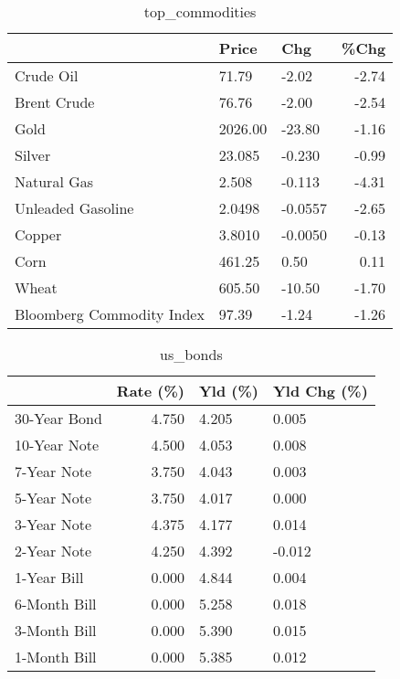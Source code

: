 \documentclass{article}%
\begin{document}
\begin{table}[htbp]%
\caption{top\_commodities}%
\centering%
\begin{adjustbox}{width=1\textwidth}%
\begin{tabular}{lllr}
\toprule
                          &   Price &     Chg &  \%Chg \\
\midrule
               Crude Oil  &   71.79 &   -2.02 & -2.74 \\
             Brent Crude  &   76.76 &   -2.00 & -2.54 \\
                    Gold  & 2026.00 &  -23.80 & -1.16 \\
                  Silver  &  23.085 &  -0.230 & -0.99 \\
             Natural Gas  &   2.508 &  -0.113 & -4.31 \\
       Unleaded Gasoline  &  2.0498 & -0.0557 & -2.65 \\
                  Copper  &  3.8010 & -0.0050 & -0.13 \\
                    Corn  &  461.25 &    0.50 &  0.11 \\
                   Wheat  &  605.50 &  -10.50 & -1.70 \\
Bloomberg Commodity Index &   97.39 &   -1.24 & -1.26 \\
\bottomrule
\end{tabular}
%
\end{adjustbox}%
\end{table}

%


\begin{table}[htbp]%
\caption{us\_bonds}%
\centering%
\begin{adjustbox}{width=1\textwidth}%
\begin{tabular}{lrll}
\toprule
             &  Rate (\%) & Yld (\%) & Yld Chg (\%) \\
\midrule
30-Year Bond &     4.750 &   4.205 &       0.005 \\
10-Year Note &     4.500 &   4.053 &       0.008 \\
 7-Year Note &     3.750 &   4.043 &       0.003 \\
 5-Year Note &     3.750 &   4.017 &       0.000 \\
 3-Year Note &     4.375 &   4.177 &       0.014 \\
 2-Year Note &     4.250 &   4.392 &      -0.012 \\
 1-Year Bill &     0.000 &   4.844 &       0.004 \\
6-Month Bill &     0.000 &   5.258 &       0.018 \\
3-Month Bill &     0.000 &   5.390 &       0.015 \\
1-Month Bill &     0.000 &   5.385 &       0.012 \\
\bottomrule
\end{tabular}
%
\end{adjustbox}%
\end{table}
\end{document}
